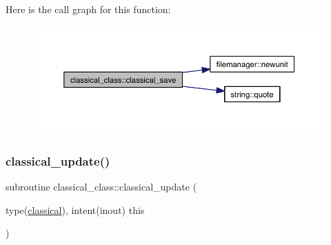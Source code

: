 Here is the call graph for this function\+:\nopagebreak
\begin{figure}[H]
\begin{center}
\leavevmode
\includegraphics[width=350pt]{namespaceclassical__class_a961b68acb4e6f345ae596a8424866657_cgraph}
\end{center}
\end{figure}
\mbox{\label{namespaceclassical__class_afb802bbd3f8834f449275a0bdab55677}} 
\subsubsection{\texorpdfstring{classical\+\_\+update()}{classical\_update()}}
{\footnotesize\ttfamily subroutine classical\+\_\+class\+::classical\+\_\+update (\begin{DoxyParamCaption}\item[{type(\hyperlink{structclassical__class_1_1classical}{classical}), intent(inout)}]{this }\end{DoxyParamCaption})\hspace{0.3cm}{\ttfamily [private]}}

